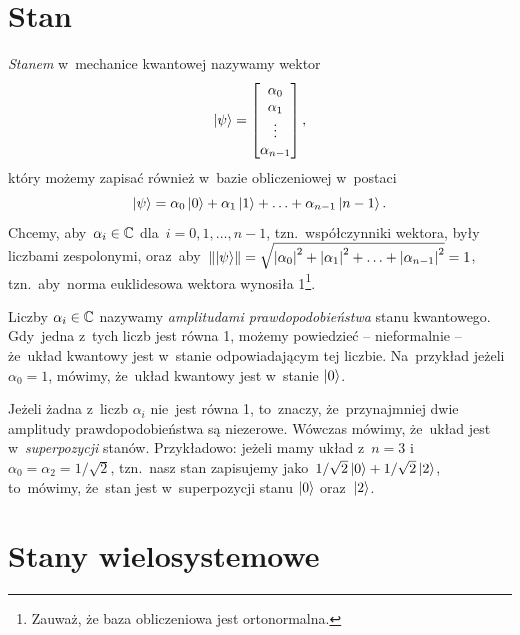 \section{Stan}
\emph{Stanem} w~mechanice kwantowej nazywamy wektor
$$
	\ket{\psi}=
	\begin{bmatrix}
		\alpha_0 \\
		\alpha_1 \\
		\vdots   \\
		\alpha_{n-1}
	\end{bmatrix},
$$
który możemy zapisać również w~bazie obliczeniowej w~postaci
$$
	\ket{\psi}=\alpha_0\ket{0} + \alpha_1 \ket{1} + \ldots + \alpha_{n-1} \ket{n-1}.
$$
Chcemy, aby~$\alpha_i \in \mathbb{C}$ dla~$i=0, 1, \ldots, n-1$, tzn.~współczynniki
wektora, były liczbami zespolonymi, oraz~aby~$\norm{\ket{\psi}} = \sqrt{\abs{\alpha_0}^2
		+ \abs{\alpha_1}^2 + \ldots + \abs{\alpha_{n-1}}^2} = 1$, tzn.~aby~norma
euklidesowa wektora wynosiła
1\footnote{Zauważ, że baza obliczeniowa jest ortonormalna.}.

Liczby $\alpha_i \in \mathbb{C}$ nazywamy
\emph{amplitudami prawdopodobieństwa} stanu kwantowego. Gdy~jedna
z~tych liczb jest równa 1, możemy powiedzieć -- nieformalnie -- że~układ
kwantowy jest w~stanie odpowiadającym tej liczbie. Na~przykład jeżeli~$\alpha_0=1$,
mówimy, że~układ kwantowy jest w~stanie $\ket{0}$.

Jeżeli żadna z~liczb $\alpha_i$ nie~jest równa 1, to~znaczy, że~przynajmniej dwie
amplitudy prawdopodobieństwa są niezerowe. Wówczas mówimy, że~układ jest w~\emph{superpozycji}
stanów. Przykładowo: jeżeli mamy układ z~$n=3$ i~$\alpha_0 = \alpha_2 = 1/\sqrt{2}$, tzn.~nasz
stan zapisujemy jako~$1/\sqrt{2}\ket{0}+1/\sqrt{2}\ket{2}$, to~mówimy, że~stan
jest w~superpozycji stanu $\ket{0}$ oraz~$\ket{2}$.

\section{Stany wielosystemowe}
